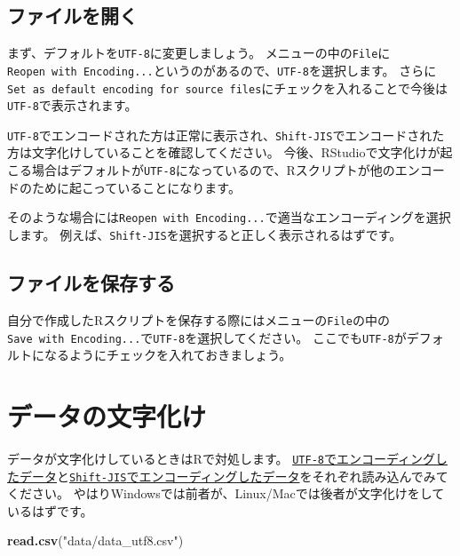 \documentclass[]{bxjsreport}
\newenvironment{Shaded}{\begin{snugshade}}{\end{snugshade}}
\newcommand{\KeywordTok}[1]{\textcolor[rgb]{0.13,0.29,0.53}{\textbf{#1}}}
\newcommand{\NormalTok}[1]{#1}
\newcommand{\StringTok}[1]{\textcolor[rgb]{0.31,0.60,0.02}{#1}}
\let\asdf\section
\renewcommand{\section}{\chapter}
\let\asdff\subsection
\renewcommand{\subsection}{\asdf}
\renewcommand{\subsubsection}{\asdff}
\begin{document}
\hypertarget{ux30d5ux30a1ux30a4ux30ebux3092ux958bux304f}{%
\subsubsection{ファイルを開く}\label{ux30d5ux30a1ux30a4ux30ebux3092ux958bux304f}}

まず、デフォルトを\texttt{UTF-8}に変更しましょう。
メニューの中の\texttt{File}に\texttt{Reopen\ with\ Encoding...}というのがあるので、\texttt{UTF-8}を選択します。
さらに\texttt{Set\ as\ default\ encoding\ for\ source\ files}にチェックを入れることで今後は\texttt{UTF-8}で表示されます。

\texttt{UTF-8}でエンコードされた方は正常に表示され、\texttt{Shift-JIS}でエンコードされた方は文字化けしていることを確認してください。
今後、RStudioで文字化けが起こる場合はデフォルトが\texttt{UTF-8}になっているので、Rスクリプトが他のエンコードのために起こっていることになります。

そのような場合には\texttt{Reopen\ with\ Encoding...}で適当なエンコーディングを選択します。
例えば、\texttt{Shift-JIS}を選択すると正しく表示されるはずです。

\hypertarget{ux30d5ux30a1ux30a4ux30ebux3092ux4fddux5b58ux3059ux308b}{%
\subsubsection{ファイルを保存する}\label{ux30d5ux30a1ux30a4ux30ebux3092ux4fddux5b58ux3059ux308b}}

自分で作成したRスクリプトを保存する際にはメニューの\texttt{File}の中の\texttt{Save\ with\ Encoding...}で\texttt{UTF-8}を選択してください。
ここでも\texttt{UTF-8}がデフォルトになるようにチェックを入れておきましょう。

\hypertarget{ux30c7ux30fcux30bfux306eux6587ux5b57ux5316ux3051}{%
\subsection{データの文字化け}\label{ux30c7ux30fcux30bfux306eux6587ux5b57ux5316ux3051}}

データが文字化けしているときはRで対処します。
\href{data/data_utf8.csv}{\texttt{UTF-8}でエンコーディングしたデータ}と\href{data/data_sjis.csv}{\texttt{Shift-JIS}でエンコーディングしたデータ}をそれぞれ読み込んでみてください。
やはりWindowsでは前者が、Linux/Macでは後者が文字化けをしているはずです。

\begin{Shaded}
\begin{Highlighting}[]
\KeywordTok{read.csv}\NormalTok{(}\StringTok{"data/data_utf8.csv"}\NormalTok{)}
\end{Highlighting}
\end{Shaded}
\end{document}
